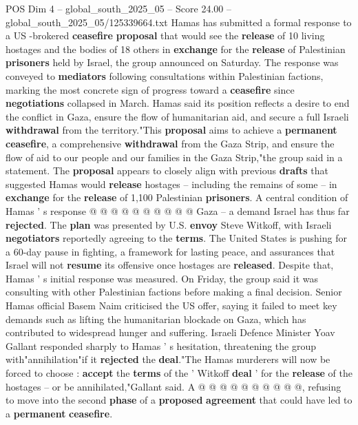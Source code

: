 \begin{textsample}{POS Dim 4 – global\_south\_2025\_05 – Score 24.00 – global\_south\_2025\_05/125339664.txt}  \label{ex:f4_pos_092}
Hamas has submitted a formal response to a US -brokered \textbf{ceasefire} \textbf{proposal} that would see the \textbf{release} of 10 living hostages and the bodies of 18 others in \textbf{exchange} for the \textbf{release} of Palestinian \textbf{prisoners} held by Israel, the group announced on Saturday.
The response was conveyed to \textbf{mediators} following consultations within Palestinian factions, marking the most concrete sign of progress toward a \textbf{ceasefire} since \textbf{negotiations} collapsed in March.
Hamas said its position reflects a desire to end the conflict in Gaza, ensure the flow of humanitarian aid, and secure a full Israeli \textbf{withdrawal} from the territory."This \textbf{proposal} aims to achieve a \textbf{permanent} \textbf{ceasefire}, a comprehensive \textbf{withdrawal} from the Gaza Strip, and ensure the flow of aid to our people and our families in the Gaza Strip,"the group said in a statement.
The \textbf{proposal} appears to closely align with previous \textbf{drafts} that suggested Hamas would \textbf{release} hostages -- including the remains of some -- in \textbf{exchange} for the \textbf{release} of 1,100 Palestinian \textbf{prisoners}.
A central condition of Hamas ' s response @ @ @ @ @ @ @ @ @ @ Gaza -- a demand Israel has thus far \textbf{rejected}.
The \textbf{plan} was presented by U.S. \textbf{envoy} Steve Witkoff, with Israeli \textbf{negotiators} reportedly agreeing to the \textbf{terms}.
The United States is pushing for a 60-day pause in fighting, a framework for lasting peace, and assurances that Israel will not \textbf{resume} its offensive once hostages are \textbf{released}.
Despite that, Hamas ' s initial response was measured.
On Friday, the group said it was consulting with other Palestinian factions before making a final decision.
Senior Hamas official Basem Naim criticised the US offer, saying it failed to meet key demands such as lifting the humanitarian blockade on Gaza, which has contributed to widespread hunger and suffering.
Israeli Defence Minister Yoav Gallant responded sharply to Hamas ' s hesitation, threatening the group with"annihilation"if it \textbf{rejected} the \textbf{deal}."The Hamas murderers will now be forced to choose : \textbf{accept} the \textbf{terms} of the ' Witkoff \textbf{deal} ' for the \textbf{release} of the hostages -- or be annihilated,"Gallant said.
A @ @ @ @ @ @ @ @ @ @, refusing to move into the second \textbf{phase} of a \textbf{proposed} \textbf{agreement} that could have led to a \textbf{permanent} \textbf{ceasefire}.

\end{textsample}
